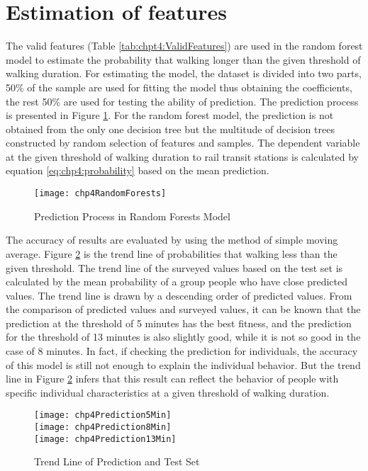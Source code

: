 %
\section{Estimation of features}
The valid features (Table \ref{tab:chpt4:ValidFeatures}) are used in the random forest model to estimate the probability that walking longer than the given threshold of walking duration. For estimating the model, the dataset is divided into two parts, 50\% of the sample are used for fitting the model thus obtaining the coefficients, the rest 50\% are used for testing the ability of prediction. The prediction process is presented in Figure \ref{fig:chp4:RandomForests}. For the random forest model, the prediction is not obtained from the only one decision tree but the multitude of decision trees constructed by random selection of features and samples. The dependent variable at the given threshold of walking duration to rail transit stations is calculated by equation \ref{eq:chp4:probability} based on the mean prediction.

\begin{figure}[htbp]
	\centering
	\texttt{[image: chp4RandomForests]}
	\caption{Prediction Process in Random Forests Model}
	\label{fig:chp4:RandomForests}
\end{figure}

%
The accuracy of results are evaluated by using the method of simple moving average. Figure \ref{fig:chp4:Prediction} is the trend line of probabilities that walking less than the given threshold. The trend line of the surveyed values based on the test set is calculated by the mean probability of a group people who have close predicted values. The trend line is drawn by a descending order of predicted values. From the comparison of predicted values and surveyed values, it can be known that the prediction at the threshold of 5 minutes has the best fitness, and the prediction for the threshold of 13 minutes is also slightly good, while it is not so good in the case of 8 minutes. In fact, if checking the prediction for individuals, the accuracy of this model is still not enough to explain the individual behavior. But the trend line in Figure \ref{fig:chp4:Prediction} infers that this result can reflect the behavior of people with specific individual characteristics at a given threshold of walking duration. 

\begin{figure}[htbp]
	\centering
	\texttt{[image: chp4Prediction5Min]}\\
	\texttt{[image: chp4Prediction8Min]}\\
	\texttt{[image: chp4Prediction13Min]}\\
	\caption{Trend Line of Prediction and Test Set}
	\label{fig:chp4:Prediction}
\end{figure}

